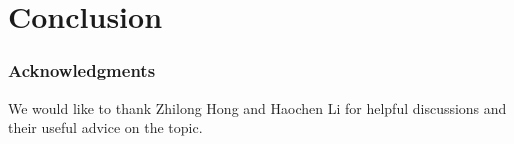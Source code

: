 \documentclass{article}
\begin{document}
\section{Conclusion}














\subsubsection*{Acknowledgments}

We would like to thank Zhilong Hong and Haochen Li for helpful discussions and their useful advice on the topic. %

\small


\end{document}
